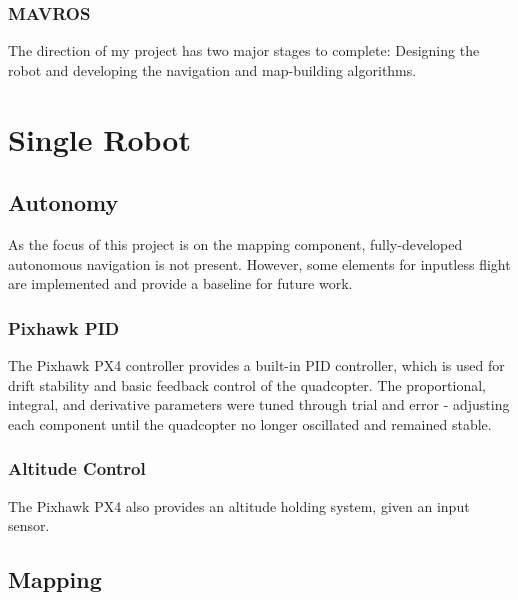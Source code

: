 \documentclass[letterpaper, oneside, 10pt]{report}
\begin{document}
\subsection{MAVROS}

The direction of my project has two major stages to complete: Designing the robot and developing the navigation and map-building algorithms. \\


\chapter{Single Robot}

\section{Autonomy}
As the focus of this project is on the mapping component, fully-developed autonomous navigation is not present. However, some elements for inputless flight are implemented and provide a baseline for future work.

    \subsection{Pixhawk PID}
    The Pixhawk PX4 controller provides a built-in PID controller, which is used for drift stability and basic feedback control of the quadcopter. The proportional, integral, and derivative parameters were tuned through trial and error - adjusting each component until the quadcopter no longer oscillated and remained stable.

    \subsection{Altitude Control}

    The Pixhawk PX4 also provides an altitude holding system, given an input sensor.

\section{Mapping}
\end{document}
